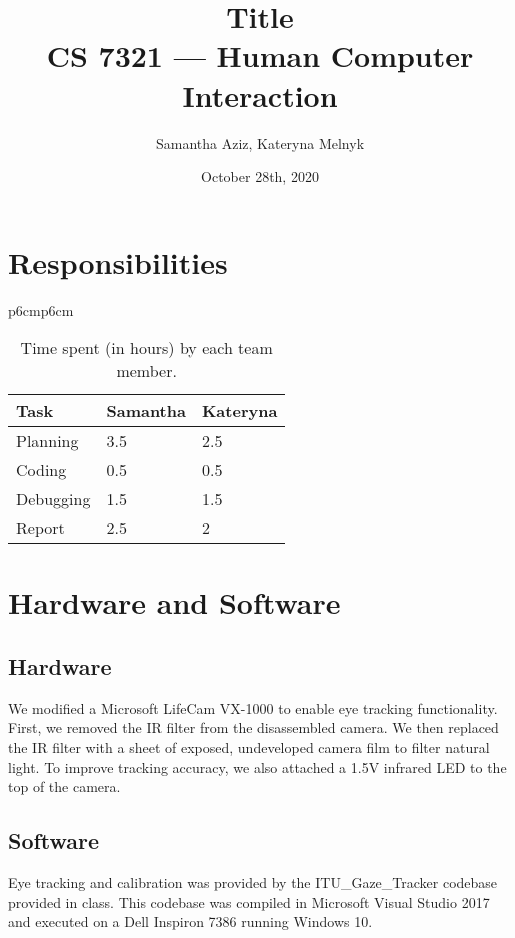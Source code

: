 \documentclass[11pt]{article}
\begin{document}
\title{Title \\ CS 7321 — Human Computer Interaction}
\author{Samantha Aziz, Kateryna Melnyk}  %
\date{October 28th, 2020}
\maketitle

\section{Responsibilities} %
    \begin{table}[h!]
        \begin{center}
        \begin{tabular}{p{6cm}p{6cm}}
            \begin{tabular}{lll}
            \toprule
            Task & Samantha & Kateryna \\
            \midrule
            Planning & 3.5 & 2.5 \\
            \midrule
            Coding & 0.5 & 0.5 \\
            \midrule
            Debugging & 1.5 & 1.5 \\
            \midrule
            Report & 2.5 & 2 \\
            \bottomrule
            \end{tabular}
        \end{tabular}
        \caption{Time spent (in hours) by each team member.}
   \end{center}
   \end{table}

\section{Hardware and Software} %
\label{setup}   
\subsection{Hardware} 
We modified a Microsoft LifeCam VX-1000 to enable eye tracking functionality. First, we removed the IR filter from the disassembled camera. We then replaced the IR filter with a sheet of exposed, undeveloped camera film to filter natural light. To improve tracking accuracy, we also attached a 1.5V infrared LED to the top of the camera. \\

\subsection{Software}
Eye tracking and calibration was provided by the ITU\_Gaze\_Tracker codebase provided in class. This codebase was compiled in Microsoft Visual Studio 2017 and executed on a Dell Inspiron 7386 running Windows 10.
\end{document}

